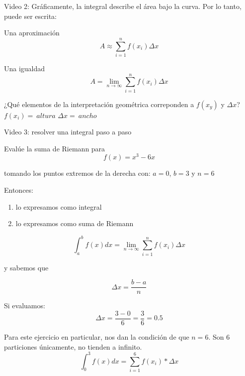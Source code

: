 \documentclass[presentation]{beamer}
\begin{document}
\begin{frame}[label=sec-10]{Video 2:}
Gráficamente, la integral describe el área bajo la curva. 
Por lo tanto, puede ser escrita:
\begin{block}{Una aproximación}
\[A \approx \sum_{i=1}^{n}f(x_{i})  \Delta x \]
\end{block}

\begin{block}{Una igualdad}
\[A =  \lim_{n\to\infty} \sum_{i=1}^{n}f(x_{i})  \Delta x \]
\end{block}

\begin{block}{¿Qué elementos de la interpretación geométrica correponden a \(f(x_{y})\) y \(\Delta x\)?}
\(f(x_{i}) =\ altura  \)
\(\Delta x =\ ancho \)
\end{block}
\end{frame}



\begin{frame}[label=sec-11]{Video  3: resolver una integral paso a paso}
\begin{block}{Evalúe la suma de Riemann para}
\[f(x) = x^3 - 6x\]

tomando los puntos extremos de la derecha con: 
\(a = 0\), \(b = 3\) y \(n = 6\)
\end{block}

\begin{block}{Entonces:}
\begin{enumerate}
\item lo expresamos como integral
\item lo expresamos como suma de Riemann
\end{enumerate}

\[\int_{a}^{b} f(x)dx = \lim_{n\to\infty} \sum_{i=1}^{n}f(x_{i})  \Delta x \]

y sabemos que

\[\Delta x = \frac{b - a}{n}\]
\end{block}
\end{frame}

\begin{frame}[label=sec-12]{Si evaluamos:}
\[\Delta x = \frac{3 - 0}{6} = \frac{3}{6} = 0.5\]

Para este ejercicio en particular, nos dan la condición de que \(n = 6\). Son 6 particiones únicamente, no 
tienden a infinito. 
\[\int_{0}^{3} f(x)dx = \sum_{i=1}^{6}f(x_{i}) * \Delta x \]
\end{frame}
\end{document}
